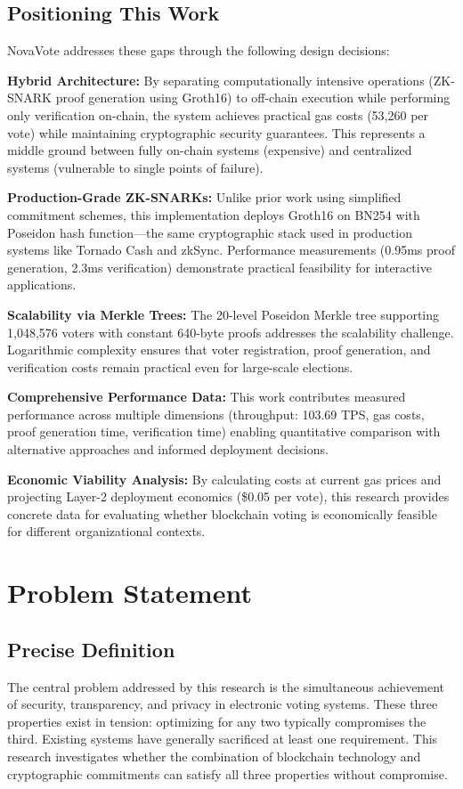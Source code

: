 \documentclass[conference]{IEEEtran}
\begin{document}
\subsection{Positioning This Work}

NovaVote addresses these gaps through the following design decisions:

\textbf{Hybrid Architecture:} By separating computationally intensive operations (ZK-SNARK proof generation using Groth16) to off-chain execution while performing only verification on-chain, the system achieves practical gas costs (53,260 per vote) while maintaining cryptographic security guarantees. This represents a middle ground between fully on-chain systems (expensive) and centralized systems (vulnerable to single points of failure).

\textbf{Production-Grade ZK-SNARKs:} Unlike prior work using simplified commitment schemes, this implementation deploys Groth16 on BN254 with Poseidon hash function---the same cryptographic stack used in production systems like Tornado Cash and zkSync. Performance measurements (0.95ms proof generation, 2.3ms verification) demonstrate practical feasibility for interactive applications.

\textbf{Scalability via Merkle Trees:} The 20-level Poseidon Merkle tree supporting 1,048,576 voters with constant 640-byte proofs addresses the scalability challenge. Logarithmic complexity ensures that voter registration, proof generation, and verification costs remain practical even for large-scale elections.

\textbf{Comprehensive Performance Data:} This work contributes measured performance across multiple dimensions (throughput: 103.69 TPS, gas costs, proof generation time, verification time) enabling quantitative comparison with alternative approaches and informed deployment decisions.

\textbf{Economic Viability Analysis:} By calculating costs at current gas prices and projecting Layer-2 deployment economics (\$0.05 per vote), this research provides concrete data for evaluating whether blockchain voting is economically feasible for different organizational contexts.

\section{Problem Statement}

\subsection{Precise Definition}
The central problem addressed by this research is the simultaneous achievement of security, transparency, and privacy in electronic voting systems. These three properties exist in tension: optimizing for any two typically compromises the third. Existing systems have generally sacrificed at least one requirement. This research investigates whether the combination of blockchain technology and cryptographic commitments can satisfy all three properties without compromise.
\end{document}
